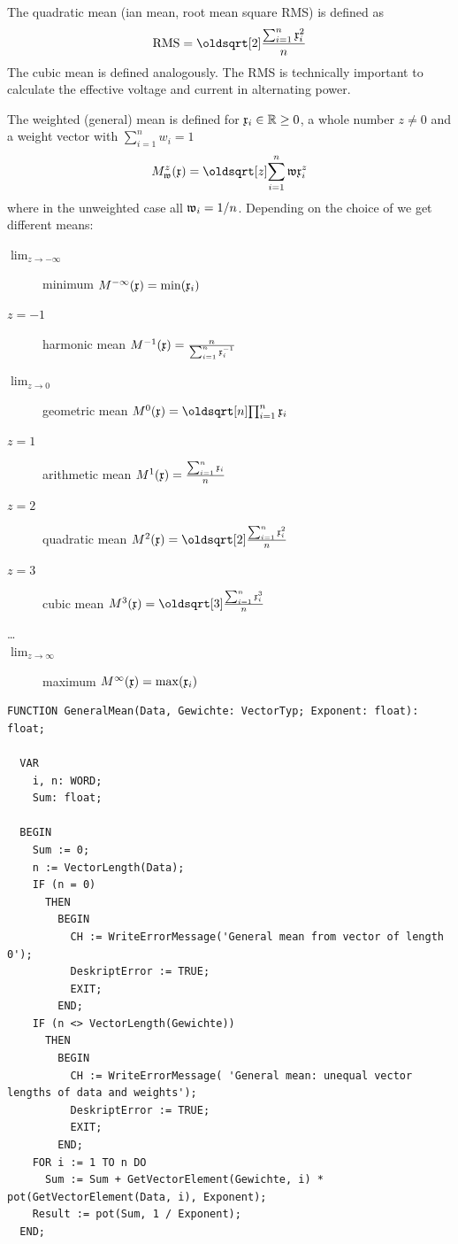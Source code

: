 \begin{refsection}
The quadratic mean (ian mean, root mean square RMS) is defined as
\begin{equation}
  \mathrm{RMS} = \sqrt[2]{\frac{\sum_{i=1}^n{\AbsVec{x}_i^2}}{n}}
\end{equation}
The cubic mean is defined analogously. The RMS is technically important to calculate the effective voltage and current in alternating power.

The weighted  (general) mean is defined for \( \mathfrak{x}_i \in \mathbb{R} \geq 0 \), a whole number \(z \neq 0 \) and a weight vector  with \( \sum_{i=1}^n{w_i} = 1\)
\begin{equation}
  M_\AbsVec{w}^z(\AbsVec{x}) = \sqrt[z]{\sum_{i=1}^n{\AbsVec{w}\AbsVec{x}^z_i}}
\end{equation}
where in the unweighted case all \( \mathfrak{w}_i = 1/n \). Depending on the choice of  we get different means:
\begin{description}
  \item[\( \lim_{z \rightarrow -\infty} \)]{minimum \( M^{-\infty}(\mathfrak{x}) = \min(\mathfrak{x}_i)  \)}
  \item[\( z = -1 \)]{harmonic mean \( M^{-1}(\mathfrak{x}) = \frac{n}{\sum_{i=1}^n{\mathfrak{x}_i^{-1}}}  \)}
  \item[\( \lim_{z \rightarrow 0} \)]{geometric mean  \( M^{0}(\AbsVec{x}) = \sqrt[n]{\prod_{i=1}^n{\AbsVec{x}_i}}  \)}
  \item[\( z = 1 \)]{arithmetic mean  \( M^1(\mathfrak{x}) = \frac{\sum_{i=1}^n{\mathfrak{x}_i}}{n}  \)}
  \item[\( z = 2 \)]{quadratic mean  \( M^2(\AbsVec{x}) = \sqrt[2]{\frac{\sum_{i=1}^n{\AbsVec{x}_i^2}}{n}}  \)}
  \item[\( z = 3 \)]{cubic mean \( M^3(\AbsVec{x}) = \sqrt[3]{\frac{\sum_{i=1}^n{\AbsVec{x}_i^3}}{n}}  \)}
  \item[\ldots]{}
  \item[\( \lim_{z \rightarrow \infty} \)]{maximum \( M^{\infty}(\mathfrak{x}) = \max(\mathfrak{x}_i)  \)}
\end{description}

\begin{lstlisting}[caption=\Name{Hölder} mean]
  FUNCTION GeneralMean(Data, Gewichte: VectorTyp; Exponent: float): float;

  VAR
    i, n: WORD;
    Sum: float;

  BEGIN
    Sum := 0;
    n := VectorLength(Data);
    IF (n = 0)
      THEN
        BEGIN
          CH := WriteErrorMessage('General mean from vector of length 0');
          DeskriptError := TRUE;
          EXIT;
        END;
    IF (n <> VectorLength(Gewichte))
      THEN
        BEGIN
          CH := WriteErrorMessage( 'General mean: unequal vector lengths of data and weights');
          DeskriptError := TRUE;
          EXIT;
        END;
    FOR i := 1 TO n DO
      Sum := Sum + GetVectorElement(Gewichte, i) * pot(GetVectorElement(Data, i), Exponent);
    Result := pot(Sum, 1 / Exponent);
  END;
\end{lstlisting}


\end{refsection}
